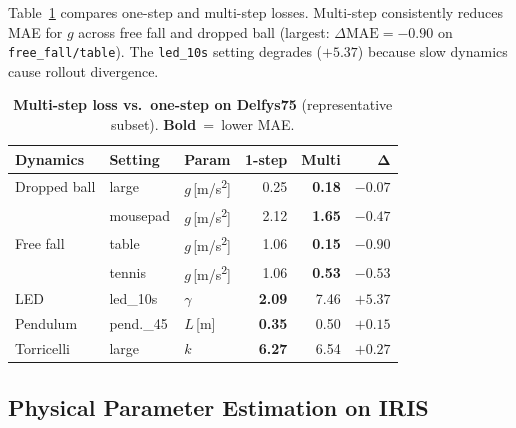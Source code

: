 \documentclass[runningheads]{llncs}
\begin{document}
Table~\ref{tab:multistep_ablation} compares one-step and multi-step losses. Multi-step consistently reduces MAE for $g$ across free fall and dropped ball (largest: $\Delta\mathrm{MAE} = -0.90$ on \texttt{free\_fall/table}). The \texttt{led\_10s} setting degrades ($+5.37$) because slow dynamics cause rollout divergence.

\begin{table}[t]
  \centering
  \caption{\textbf{Multi-step loss vs.\ one-step on Delfys75} (representative subset). \colorbox{bestcolor}{\textbf{Bold}}~=~lower MAE.}
  \label{tab:multistep_ablation}
  \scriptsize
  \setlength{\tabcolsep}{3pt}
  \renewcommand{\arraystretch}{1.05}
  \begin{tabular}{@{}lllrrr@{}}
    \toprule
    \textbf{Dynamics} & \textbf{Setting} & \textbf{Param} &
    \textbf{1-step} & \textbf{Multi} & $\bm{\Delta}$ \\
    \midrule
    Dropped ball & large & $g$\,[m/s\textsuperscript{2}] & 0.25 & \cellcolor{bestcolor}\textbf{0.18} & $-0.07$ \\
    \multirow{3}{*}{Free fall}
        & mousepad & $g$\,[m/s\textsuperscript{2}] & 2.12 & \cellcolor{bestcolor}\textbf{1.65} & $-0.47$ \\
        & table & $g$\,[m/s\textsuperscript{2}] & 1.06 & \cellcolor{bestcolor}\textbf{0.15} & $-0.90$ \\
        & tennis & $g$\,[m/s\textsuperscript{2}] & 1.06 & \cellcolor{bestcolor}\textbf{0.53} & $-0.53$ \\
    LED & led\_10s & $\gamma$ & \cellcolor{bestcolor}\textbf{2.09} & 7.46 & $+5.37$ \\
    Pendulum & pend.\_45 & $L$\,[m] & \cellcolor{bestcolor}\textbf{0.35} & 0.50 & $+0.15$ \\
    Torricelli & large & $k$ & \cellcolor{bestcolor}\textbf{6.27} & 6.54 & $+0.27$ \\
    \bottomrule
  \end{tabular}
\end{table}

\subsection{Physical Parameter Estimation on IRIS}
\label{sec:exp_iris}
\end{document}
